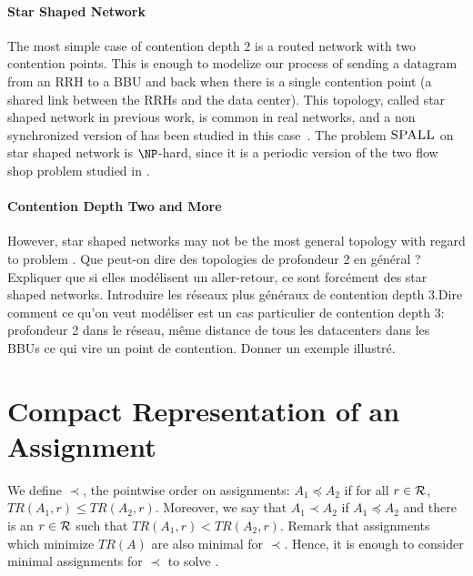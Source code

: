 \documentclass[english]{article}
\begin{document}
\paragraph*{Star Shaped Network}

The most simple case of contention depth $2$ is a routed network with two contention points. 
This is enough to modelize our process of sending a datagram from an RRH to a BBU and back when
there is a single contention point (a shared link between the RRHs and the data center). 
This topology, called star shaped network in previous work, is common in real networks, and a non synchronized version of \spall has been studied in this case~\cite{Guir1806:Deterministic,barth2018deterministic,guiraud2020scheduling}.
The problem $\textsc{SPALL}$ on star shaped network is $\NP$-hard, since it is a periodic version of 
the two flow shop problem studied in \cite{yu2004minimizing}. 

\paragraph*{Contention Depth Two and More}

However, star shaped networks may not be the most general topology with regard to problem \spall.
Que peut-on dire des topologies de profondeur 2 en général ? Expliquer que si elles modélisent un aller-retour,
ce sont forcément des star shaped networks.
Introduire les réseaux plus généraux de contention depth 3.Dire comment ce qu'on veut modéliser est un cas particulier de
contention depth 3: profondeur 2 dans le réseau, même
distance de tous les datacenters dans les BBUs ce qui vire un point de contention. Donner un exemple illustré.


\section{Compact Representation of an Assignment}

 We define $\prec$, the pointwise order on assignments: $A_1 \preceq A_2$ if for all $r\in \cal{R}$, $TR(A_1,r) \leq TR(A_2,r)$. Moreover, we say that $A_1 \prec A_2$ if $A_1 \preceq A_2$ and there is an $r \in \cal {R}$ such that  $TR(A_1,r) < TR(A_2,r)$. Remark that assignments which minimize $TR(A)$ are also minimal for $\prec$. Hence, it is enough to consider minimal assignments for $\prec$ to solve \spall.
\end{document}
